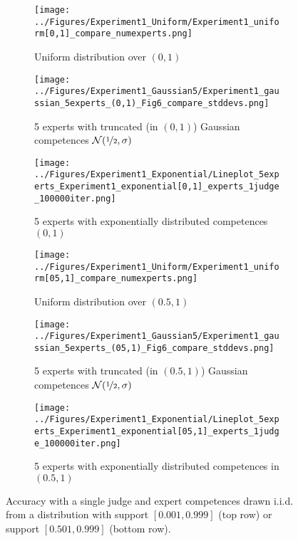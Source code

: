 \documentclass[letterpaper]{article} %
\begin{document}
\begin{figure*}[t]
\centering
\begin{subfigure}{0.3\textwidth}
 \texttt{[image: ../Figures/Experiment1\_Uniform/Experiment1\_uniform[0,1]\_compare\_numexperts.png]}
 \caption{Uniform distribution over $(0,1)$}
\label{fig:E1_uniform_01}
\end{subfigure}
\hfill
\begin{subfigure}{0.3\textwidth}
 \texttt{[image: ../Figures/Experiment1\_Gaussian5/Experiment1\_gaussian\_5experts\_(0,1)\_Fig6\_compare\_stddevs.png]}
 \caption{5 experts with truncated (in $(0,1)$) Gaussian competences $\mathcal{N}(\nicefrac{1}{2},\sigma)$}
 \label{fig:E1_gaussian_01_stddevs}
\end{subfigure}
\hfill
\begin{subfigure}{0.3\textwidth}
 \texttt{[image: ../Figures/Experiment1\_Exponential/Lineplot\_5experts\_Experiment1\_exponential[0,1]\_experts\_1judge\_100000iter.png]}
 \caption{5 experts with exponentially distributed competences $(0,1)$}
\label{fig:E1_exponential_01}
\end{subfigure}
\hfill
 \begin{subfigure}{0.3\textwidth}
 \texttt{[image: ../Figures/Experiment1\_Uniform/Experiment1\_uniform[05,1]\_compare\_numexperts.png]}
 \caption{Uniform distribution over $(0.5,1)$}
\label{fig:E1_uniform_05,1}
\end{subfigure}
\hfill
\begin{subfigure}{0.3\textwidth}
 \texttt{[image: ../Figures/Experiment1\_Gaussian5/Experiment1\_gaussian\_5experts\_(05,1)\_Fig6\_compare\_stddevs.png]}
 \caption{5 experts with truncated (in $(0.5,1)$) Gaussian competences $\mathcal{N}(\nicefrac{1}{2},\sigma)$}
\label{fig:E1_gaussian_05,1_stddevs}
\end{subfigure}
\hfill
\begin{subfigure}{0.3\textwidth}
 \texttt{[image: ../Figures/Experiment1\_Exponential/Lineplot\_5experts\_Experiment1\_exponential[05,1]\_experts\_1judge\_100000iter.png]}
 \caption{5 experts with exponentially distributed competences in $(0.5,1)$}
 \label{fig:E1_exponential_05,1}
\end{subfigure}
\caption{Accuracy with a single judge and expert competences drawn i.i.d. from a distribution with support $[0.001, 0.999]$ (top row) or support $[0.501, 0.999]$ (bottom row).}
\label{fig:single_judge_(0,1)}
\end{figure*}
\end{document}
